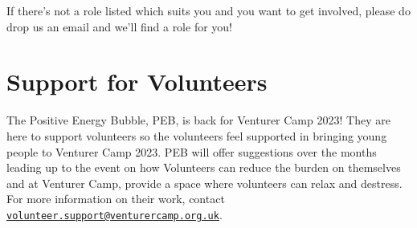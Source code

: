 \documentclass[a4paper, 10pt]{report}
\begin{document}
If there's not a role listed which suits you and you want to get involved, please do drop us an email and we'll find a role for you! 

\section{Support for Volunteers}
The Positive Energy Bubble, PEB, is back for Venturer Camp 2023! They are here to support volunteers so the volunteers feel supported in bringing young people to Venturer Camp 2023. PEB will offer suggestions over the months leading up to the event on how Volunteers can reduce the burden on themselves and at Venturer Camp, provide a space where volunteers can relax and destress. For more information on their work, contact \href{mailto:volunteer.support@venturercamp.org.uk}{\texttt{volunteer.support@venturercamp.org.uk}}.
\end{document}
